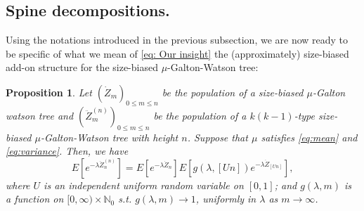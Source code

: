 \documentclass[12pt,a4paper]{amsart}
\newtheorem{prop}[thm]{Proposition}
\numberwithin{equation}{section}
\begin{document}
\subsection{Spine decompositions.}
\label{sec:spinesdecomposition}
	Using the notations introduced in the previous subsection, we are now ready to be specific of what we mean of \eqref{eq: Our insight} the (approximately) size-biased add-on structure for the size-biased $\mu$-Galton-Watson tree:
\begin{prop}\label{prop: size-biased add-on of size-biased tree }
	Let $(\dot Z_m)_{0 \leq m \leq n}$ be the population of a size-biased $\mu$-Galton watson tree and $(\ddot Z^{(n)}_m)_{0 \leq m \leq n}$ be the population of a $k(k-1)$-type size-biased $\mu$-Galton-Watson tree with height $n$.
	Suppose that $\mu$ satisfies \eqref{eq:mean} and \eqref{eq:variance}.
	Then, we have
\[
	E [ e^{- \lambda \ddot Z_n^{(n)}} ]
	= E [e^{-\lambda \dot Z_n}] E[g(\lambda, [Un])e^{-\lambda \dot Z_{[Un]}}],
\]
	where $U$ is an independent uniform random variable on $[0,1]$; and $g(\lambda, m)$ is a function on $[0,\infty) \times \mathbb N_0$ s.t.
$g(\lambda, m) \to 1$, uniformly in $\lambda$ as $m\to \infty$.
\end{prop}
\end{document}
